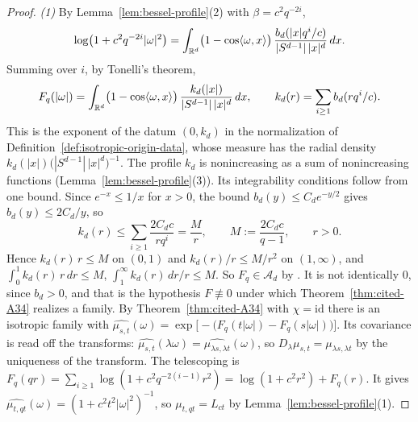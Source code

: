 \begin{proof}
\leanok
\emph{(1)} By Lemma~\ref{lem:bessel-profile}(2) with $\beta = c^2q^{-2i}$,
\[
  \log\bigl(1 + c^2q^{-2i}|\omega|^2\bigr)
   = \int_{\mathbb{R}^d}\bigl(1 - \cos\langle\omega, x\rangle\bigr)\,
     \frac{b_d(|x|q^i/c)}{|S^{d-1}|\,|x|^d}\,dx .
\]
Summing over $i$, by Tonelli's theorem,
\[
  F_q(|\omega|) = \int_{\mathbb{R}^d}\bigl(1 - \cos\langle\omega, x\rangle\bigr)\,
   \frac{k_d(|x|)}{|S^{d-1}|\,|x|^d}\,dx , \qquad k_d(r) = \sum_{i \ge 1}b_d(rq^i/c) .
\]
This is the exponent of the datum $(0, k_d)$ in the normalization of
Definition~\ref{def:isotropic-origin-data}, whose \Levy{} measure has the radial density
$k_d(|x|)\bigl(|S^{d-1}|\,|x|^d\bigr)^{-1}$. The profile $k_d$ is nonincreasing as a sum of
nonincreasing functions (Lemma~\ref{lem:bessel-profile}(3)).
Its integrability conditions follow from one bound. Since $e^{-x} \le 1/x$ for $x > 0$, the bound
$b_d(y) \le C_de^{-y/2}$ gives $b_d(y) \le 2C_d/y$, so
\[
  k_d(r) \le \sum_{i \ge 1}\frac{2C_dc}{rq^i} = \frac{M}{r} , \qquad M := \frac{2C_dc}{q - 1} ,
  \qquad r > 0 .
\]
Hence $k_d(r)\,r \le M$ on $(0, 1)$ and $k_d(r)/r \le M/r^2$ on $(1, \infty)$, and
$\int_0^1k_d(r)\,r\,dr \le M$, $\int_1^\infty k_d(r)\,dr/r \le M$. So $F_q \in \mathcal{A}_d$ by . It is not identically $0$, since $b_d > 0$, and that is the hypothesis
$F \not\equiv 0$ under which Theorem~\ref{thm:cited-A34} realizes a family.
By Theorem~\ref{thm:cited-A34} with $\chi = \mathrm{id}$ there is an isotropic family with
$\widehat{\mu_{s,t}}(\omega) = \exp\bigl[-\bigl(F_q(t|\omega|) - F_q(s|\omega|)\bigr)\bigr]$. Its
covariance is read off the transforms: $\widehat{\mu_{s,t}}(\lambda\omega) =
\widehat{\mu_{\lambda s,\lambda t}}(\omega)$, so $D_\lambda\mu_{s,t} = \mu_{\lambda s,\lambda t}$ by
the uniqueness of the transform. The telescoping is
$F_q(qr) = \sum_{i \ge 1}\log(1 + c^2q^{-2(i-1)}r^2) = \log(1 + c^2r^2) + F_q(r)$. It gives
$\widehat{\mu_{t,qt}}(\omega) = (1 + c^2t^2|\omega|^2)^{-1}$, so $\mu_{t,qt} = L_{ct}$ by
Lemma~\ref{lem:bessel-profile}(1).


\end{proof}
